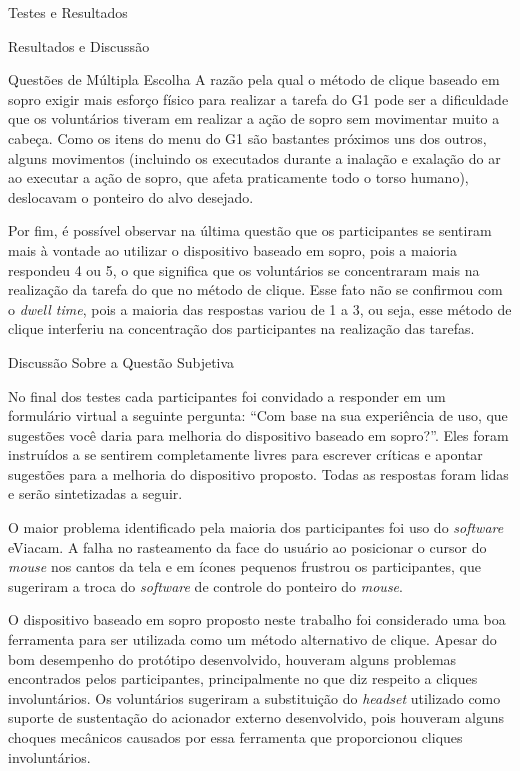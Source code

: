 \begin{chapter}{Testes e Resultados}
\begin{section}{Resultados e Discussão}
\begin{subsection}{Questões de Múltipla Escolha}
A razão pela qual o método de clique baseado em sopro exigir mais esforço físico
para realizar a tarefa do G1 pode ser a dificuldade que os voluntários tiveram
em realizar a ação de sopro sem movimentar muito a cabeça. Como os itens do menu
do G1 são bastantes próximos uns dos outros, alguns movimentos (incluindo os
executados durante a inalação e exalação do ar ao executar a ação de sopro, 
que afeta praticamente todo o torso humano), deslocavam o ponteiro do alvo
desejado.

Por fim, é possível observar na última questão que os participantes se sentiram
mais à vontade ao utilizar o dispositivo baseado em sopro, pois a maioria
respondeu 4 ou 5, o que significa que os voluntários se concentraram mais na
realização da tarefa do que no método de clique. Esse fato não se confirmou com o
\textit{dwell time}, pois a maioria das respostas variou de 1 a 3, ou seja, esse
método de clique interferiu na concentração dos participantes na realização das
tarefas. 

\end{subsection}

\begin{subsection}{Discussão Sobre a Questão Subjetiva}

No final dos testes cada participantes foi convidado a responder em um
formulário virtual a seguinte pergunta: ``Com base na sua experiência de uso,
que sugestões você daria para melhoria do dispositivo baseado em sopro?''. Eles 
foram instruídos a se sentirem completamente livres para escrever críticas e 
apontar sugestões para a melhoria do dispositivo proposto. Todas as respostas
foram lidas e serão sintetizadas a seguir.

O maior problema identificado pela maioria dos participantes foi uso do
\textit{software} eViacam. A falha no rasteamento da face do usuário ao
posicionar o cursor do \textit{mouse} nos cantos da tela e em ícones pequenos
frustrou os participantes, que sugeriram a troca do \textit{software} de
controle do ponteiro do \textit{mouse}.

O dispositivo baseado em sopro proposto neste trabalho foi considerado uma boa
ferramenta para ser utilizada como um método alternativo de clique. Apesar do
bom desempenho do protótipo desenvolvido, houveram alguns problemas encontrados
pelos participantes, principalmente no que diz respeito a cliques involuntários.
Os voluntários sugeriram a substituição do \textit{headset} utilizado como
suporte de sustentação do acionador externo desenvolvido, pois houveram alguns
choques mecânicos causados por essa ferramenta que proporcionou cliques 
involuntários.


\end{subsection}
\end{section}
\end{chapter}
